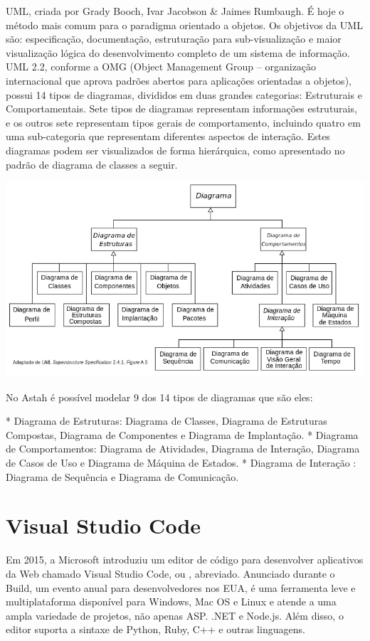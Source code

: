 UML, criada por Grady Booch, Ivar Jacobson \& Jaimes Rumbaugh. É hoje o método mais comum para o paradigma orientado a objetos. Os objetivos da UML são: especificação, documentação, estruturação para sub-visualização e maior visualização lógica do desenvolvimento completo de um sistema de informação. UML 2.2, conforme a OMG (Object Management Group – organização internacional que aprova padrões abertos para aplicações orientadas a objetos), possui 14 tipos de diagramas, divididos em duas grandes categorias: Estruturais e Comportamentais. Sete tipos de diagramas representam informações estruturais, e os outros sete representam tipos gerais de comportamento, incluindo quatro em uma sub-categoria que representam diferentes aspectos de interação. Estes diagramas podem ser visualizados de forma hierárquica, como apresentado no padrão de diagrama de classes a seguir.

\begin{center}
\includegraphics[scale=0.4]{imagens/UML_diagrams_overview_pt.svg_.png}
\end{center}

No Astah é possível modelar 9 dos 14 tipos de diagramas que são eles:

* Diagrama de Estruturas: Diagrama de Classes, Diagrama de Estruturas Compostas, Diagrama de Componentes e Diagrama de Implantação.
* Diagrama de Comportamentos: Diagrama de Atividades, Diagrama de Interação, Diagrama de Casos de Uso e Diagrama de Máquina de Estados.
* Diagrama de Interação : Diagrama de Sequência e Diagrama de Comunicação.

\section{Visual Studio Code}
Em 2015, a Microsoft introduziu um editor de código para desenvolver aplicativos da Web chamado Visual Studio Code, ou , abreviado. Anunciado durante o Build, um evento anual para desenvolvedores nos EUA, é uma ferramenta leve e multiplataforma disponível para Windows, Mac OS e Linux e atende a uma ampla variedade de projetos, não apenas ASP. .NET e Node.js. Além disso, o editor suporta a sintaxe de Python, Ruby, C++ e outras linguagens.

